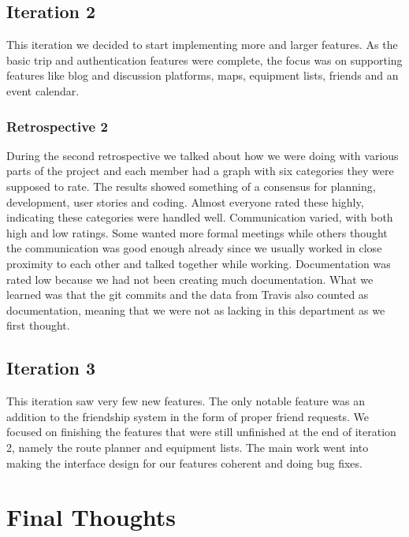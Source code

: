 \documentclass[a4paper]{article}
\begin{document}
\subsection{Iteration 2}
This iteration we decided to start implementing more and larger features. As the basic trip and authentication features were complete, the focus was on supporting features like blog and discussion platforms, maps, equipment lists, friends and an event calendar.

\subsubsection{Retrospective 2}
During the second retrospective we talked about how we were doing with various parts of the project and each member had a graph with six categories they were supposed to rate. The results showed something of a consensus for planning, development, user stories and coding. Almost everyone rated these highly, indicating these categories were handled well. Communication varied, with both high and low ratings. Some wanted more formal meetings while others thought the communication was good enough already since we usually worked in close proximity to each other and talked together while working. Documentation was rated low because we had not been creating much documentation. What we learned was that the git commits and the data from Travis also counted as documentation, meaning that we were not as lacking in this department as we first thought.

\subsection{Iteration 3}
This iteration saw very few new features. The only notable feature was an addition to the friendship system in the form of proper friend requests. We focused on finishing the features that were still unfinished at the end of iteration 2, namely the route planner and equipment lists. The main work went into making the interface design for our features coherent and doing bug fixes.


\section{Final Thoughts}
\end{document}
